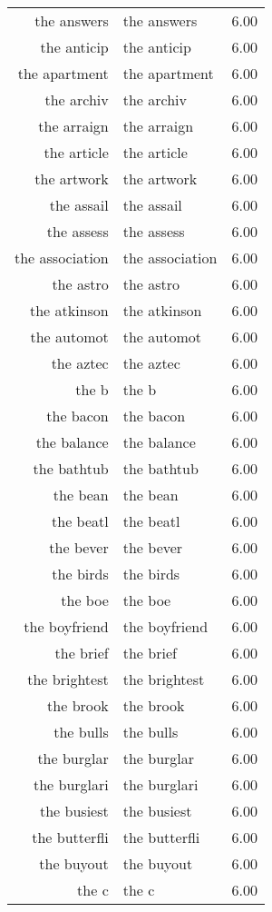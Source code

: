 \begin{table}[ht]
\begin{tabular}{rlr}
  the answers & the answers & 6.00 \\ 
  the anticip & the anticip & 6.00 \\ 
  the apartment & the apartment & 6.00 \\ 
  the archiv & the archiv & 6.00 \\ 
  the arraign & the arraign & 6.00 \\ 
  the article & the article & 6.00 \\ 
  the artwork & the artwork & 6.00 \\ 
  the assail & the assail & 6.00 \\ 
  the assess & the assess & 6.00 \\ 
  the association & the association & 6.00 \\ 
  the astro & the astro & 6.00 \\ 
  the atkinson & the atkinson & 6.00 \\ 
  the automot & the automot & 6.00 \\ 
  the aztec & the aztec & 6.00 \\ 
  the b & the b & 6.00 \\ 
  the bacon & the bacon & 6.00 \\ 
  the balance & the balance & 6.00 \\ 
  the bathtub & the bathtub & 6.00 \\ 
  the bean & the bean & 6.00 \\ 
  the beatl & the beatl & 6.00 \\ 
  the bever & the bever & 6.00 \\ 
  the birds & the birds & 6.00 \\ 
  the boe & the boe & 6.00 \\ 
  the boyfriend & the boyfriend & 6.00 \\ 
  the brief & the brief & 6.00 \\ 
  the brightest & the brightest & 6.00 \\ 
  the brook & the brook & 6.00 \\ 
  the bulls & the bulls & 6.00 \\ 
  the burglar & the burglar & 6.00 \\ 
  the burglari & the burglari & 6.00 \\ 
  the busiest & the busiest & 6.00 \\ 
  the butterfli & the butterfli & 6.00 \\ 
  the buyout & the buyout & 6.00 \\ 
  the c & the c & 6.00 \\ 

\end{tabular}
\end{table}
